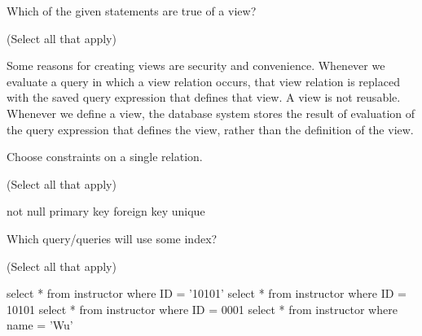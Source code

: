 \documentclass[12pt, addpoints]{exam}
\begin{document}
\begin{questions}
\begin{minipage}{\linewidth}
\question[2]
Which of the given statements are true of a view?\par\vspace{0.5em}

(Select all that apply)\par\vspace{0.5em}
\begin{checkboxes}
    \CorrectChoice Some reasons for creating views are security and convenience.
    \CorrectChoice Whenever we evaluate a query in which a view relation occurs, that view relation is replaced with the saved query expression that defines that view.
    \choice A view is not reusable.
    \choice Whenever we define a view, the database system stores the result of evaluation of the query expression that defines the view, rather than the definition of the view.
\end{checkboxes}
\end{minipage}\vspace{1em}

\begin{minipage}{\linewidth}
\question[2]
Choose constraints on a single relation.\par\vspace{0.5em}

(Select all that apply)\par\vspace{0.5em}
\begin{checkboxes}
    \CorrectChoice not null
    \CorrectChoice primary key
    \choice foreign key
    \CorrectChoice unique
\end{checkboxes}
\end{minipage}\vspace{1em}

\begin{minipage}{\linewidth}
\question[2]
Which query/queries will use some index?\par\vspace{0.5em}

(Select all that apply)\par\vspace{0.5em}
\begin{checkboxes}
    \CorrectChoice select * from instructor where ID = '10101'
    \choice select * from instructor where ID = 10101
    \choice select * from instructor where ID = 0001
    \choice select * from instructor where name = 'Wu'
\end{checkboxes}
\end{minipage}\vspace{1em}


\end{questions}
\end{document}
